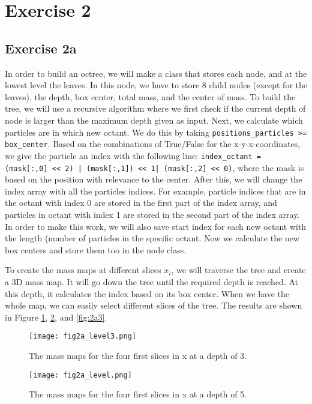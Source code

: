 \section{Exercise 2}

\subsection{Exercise 2a}
In order to build an octree, we will make a class that stores each node, and at the lowest level the leaves. In this node, we have to store 8 child nodes (except for the leaves), the depth, box center, total mass, and the center of mass. To build the tree, we will use a recursive algorithm where we first check if the current depth of node is larger than the maximum depth given as input. Next, we calculate which particles are in which new octant. We do this by taking \texttt{positions_particles >= box_center}. Based on the combinations of True/False for the x-y-x-coordinates, we give the particle an index with the following line: \texttt{index_octant = (mask[:,0] << 2) | (mask[:,1]) << 1| (mask[:,2] << 0)}, where the mask is based on the position with relevance to the center. After this, we will change the index array with all the particles indices. For example, particle indices that are in the octant with index 0 are stored in the first part of the index array, and particles in octant with index 1 are stored in the second part of the index array. In order to make this work, we will also save start index for each new octant with the length (number of particles in the specific octant. Now we calculate the new box centers and store them too in the node class. 

To create the mass maps at different slices $x_i$, we will traverse the tree and create a 3D mass map. It will go down the tree until the required depth is reached. At this depth, it calculates the index based on its box center. When we have the whole map, we can easily select different slices of the tree. The results are shown in Figure \ref{fig:2a1}, \ref{fig:2a2}, and \ref{fig:2a3}.

\begin{figure}[h!]
  \centering
  \texttt{[image: fig2a\_level3.png]}
  \caption{The mass maps for the four first slices in x at a depth of 3.}
  \label{fig:2a1}
\end{figure}

\begin{figure}[h!]
  \centering
  \texttt{[image: fig2a\_level.png]}
  \caption{The mass maps for the four first slices in x at a depth of 5.}
  \label{fig:2a2}
\end{figure}

